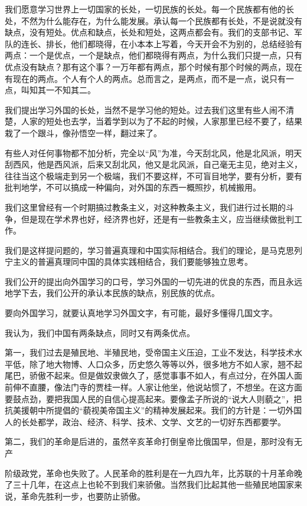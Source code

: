 我们愿意学习世界上一切国家的长处，一切民族的长处。每一个民族都有他的长处，不然为什么能存在，为什么能发展。承认每一个民族都有长处，不是说就没有缺点，没有短处。优点和缺点，长处和短处，这两点都会有。我们的支部书记、军队的连长、排长，他们都晓得，在小本本上写着，今天开会不为别的，总结经验有两点：一个是优点，一个是缺点，他们都晓得有两点，为什么我们只提一点，只有优点没有缺点？那有这个事？一万年都有两点，那个时候有那个时候的两点，现在有现在的两点。个人有个人的两点。总而言之，是两点，而不是一点，说只有一点，叫知其一不知其二。

我们提出学习外国的长处，当然不是学习他的短处。过去我们这里有些人闹不清楚，人家的短处也去学，当着学到以为了不起的时候，人家那里已经不要了，结果栽了一个跟斗，像孙悟空一样，翻过来了。

有些人对任何事物都不加分析，完全以“风”为准，今天刮北风，他是北风派，明天刮西风，他是西风派，后来又刮北风，他又是北风派，自己毫无主见，绝对主义，往往当这个极端走到另一个极端，我们不要这样，不可盲目地学，要有分析，要有批判地学，不可以搞成一种偏向，对外国的东西一概照抄，机械搬用。

我们这里曾经有一个时期搞过教条主义，对这种教条主义，我们进行过长期的斗争，但是现在学术界也好，经济界也好，还是有一些教条主义，应当继续做批判工作。

我们是这样提问题的，学习普遍真理和中国实际相结合。我们的理论，是马克思列宁主义的普遍真理同中国的具体实践相结合，我们要能够独立思考。

我们公开的提出向外国学习的口号，学习外国的一切先进的优良的东西，而且永远地学下去，我们公开的承认本民族的缺点，别民族的优点。

要向外国学习，就要认真地学习外国文字，有可能，最好多懂得几国文字。

我认为，我们中国有两条缺点，同时又有两条优点。

第一，我们过去是殖民地、半殖民地，受帝国主义压迫，工业不发达，科学技术水平低，除了地大物博、人口众多，历史悠久等等以外，很多地方不如人家，翘不起尾巴，骄傲不起来。但是做奴隶做久了，感觉事事不如人，有点过分，在外国人面前伸不直腰，像法门寺的贾桂一样。人家让他坐，他说站惯了，不想坐。在这方面要鼓点劲，要把我国人民的自信心提高起来。要像孟子所说的“说大人则藐之”，把抗美援朝中所提倡的“藐视美帝国主义”的精神发展起来。我们的方针是：一切外国人的长处都学，政治、经济、科学、技术、文学、文艺的一切好东西都要学。

第二，我们的革命是后进的，虽然辛亥革命打倒皇帝比俄国早，但是，那时没有无产

阶级政党，革命也失败了。人民革命的胜利是在一九四九年，比苏联的十月革命晚了三十几年，在这点上也轮不到我们来骄傲。当然我们比起其他一些殖民地国家来说，革命先胜利一步，也要防止骄傲。

